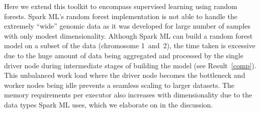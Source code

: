 \documentclass[10pt,letterpaper]{article}
\newcommand{\cursedforest}{{\sc CursedForest}}
\let\oldmarginpar\marginpar
\renewcommand\marginpar[1]{\-\oldmarginpar[\raggedleft\footnotesize #1]%
{\raggedright\footnotesize #1}}
\begin{document}
Here we extend this toolkit to encompass supervised learning using random forests.  Spark ML's random forest implementation is not
able to handle the extremely ``wide'' genomic data as it was developed for large number of samples with only modest
dimensionality.  Although Spark ML can build a random forest model on a subset of the data (chromosome 1~and~2), the time taken is
excessive due to the huge amount of data being aggregated and processed by the single driver node during intermediate
stages of building the model (see Result~\ref{comp}).  This unbalanced work load where the driver node becomes the
bottleneck and worker nodes being idle prevents a seamless scaling to larger datasets. The memory requirements per
executor also increases with dimensionality due to the data types Spark ML uses, which we elaborate on in the
discussion.

 

\end{document}
